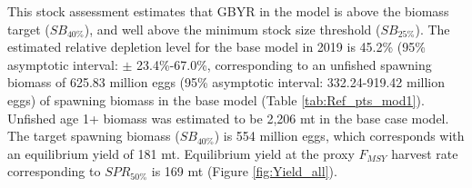 \documentclass[12pt,]{article}
\begin{document}
This stock assessment estimates that GBYR in the model is above the
biomass target (\(SB_{40\%}\)), and well above the minimum stock size
threshold (\(SB_{25\%}\)). The estimated relative depletion level for
the base model in 2019 is 45.2\% (95\% asymptotic interval: \(\pm\)
23.4\%-67.0\%, corresponding to an unfished spawning biomass of 625.83
million eggs (95\% asymptotic interval: 332.24-919.42 million eggs) of
spawning biomass in the base model (Table \ref{tab:Ref_pts_mod1}).
Unfished age 1+ biomass was estimated to be 2,206 mt in the base case
model. The target spawning biomass (\(SB_{40\%}\)) is 554 million eggs,
which corresponds with an equilibrium yield of 181 mt. Equilibrium yield
at the proxy \(F_{MSY}\) harvest rate corresponding to \(SPR_{50\%}\) is
169 mt (Figure \ref{fig:Yield_all}).

\FloatBarrier
\end{document}
